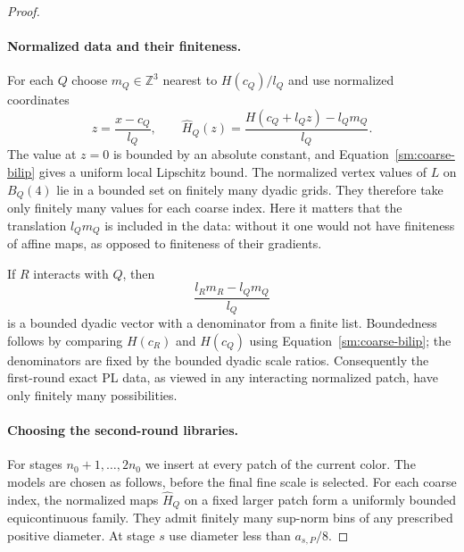 \documentclass[11pt]{article}
\numberwithin{equation}{section}
\theoremstyle{definition}
\theoremstyle{remark}
\begin{document}
\begin{proof}
\paragraph{Normalized data and their finiteness.}
For each $Q$ choose $m_Q\in\mathbb Z^3$ nearest to
$H(c_Q)/l_Q$ and use normalized coordinates
\begin{equation}
 \label{sm:normalization}
 z=\frac{x-c_Q}{l_Q},\qquad
 \widehat H_Q(z)=\frac{H(c_Q+l_Qz)-l_Qm_Q}{l_Q}.
\end{equation}
The value at $z=0$ is bounded by an absolute constant,
and Equation~\eqref{sm:coarse-bilip} gives a uniform local
Lipschitz bound.  The normalized vertex values of $L$
on $B_Q(4)$ lie in a bounded set on finitely many
dyadic grids.  They therefore take only finitely many
values for each coarse index.  Here it matters that
the translation $l_Qm_Q$ is included in the data:
without it one would not have finiteness of affine
maps, as opposed to finiteness of their gradients.

If $R$ interacts with $Q$, then
\begin{equation}
 \label{sm:relative-origins}
 \frac{l_Rm_R-l_Qm_Q}{l_Q}
\end{equation}
is a bounded dyadic vector with a denominator from a
finite list.  Boundedness follows by comparing
$H(c_R)$ and $H(c_Q)$ using Equation~\eqref{sm:coarse-bilip};
the denominators are fixed by the bounded dyadic
scale ratios.  Consequently the first-round exact
PL data, as viewed in any interacting normalized
patch, have only finitely many possibilities.

\paragraph{Choosing the second-round libraries.}
For stages $n_0+1,\ldots,2n_0$ we insert at every
patch of the current color.  The models are chosen
as follows, before the final fine scale is selected.
For each coarse index, the normalized maps
$\widehat H_Q$ on a fixed larger patch form a
uniformly bounded equicontinuous family.  They
admit finitely many sup-norm bins of any prescribed
positive diameter.  At stage $s$ use diameter less
than $a_{s,P}/8$.


\end{proof}
\end{document}

